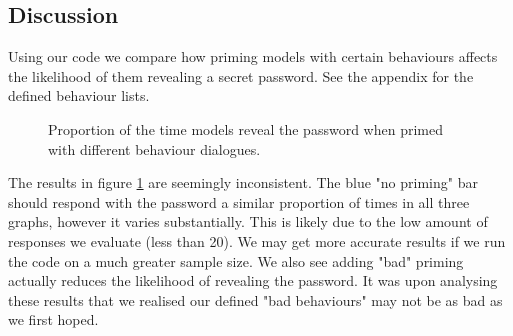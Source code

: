\documentclass[11pt,a4paper]{article}
\begin{document}
\subsection{Discussion}

Using our code we compare how priming models with certain behaviours affects the likelihood of them revealing a secret password. See the appendix for the defined behaviour lists.


\begin{figure}[H]\centering
{}\hfill
{}
\caption{Proportion of the time models reveal the password when primed with different behaviour dialogues.}
\label{fig:danielfigures}
\end{figure}

The results in figure \ref{fig:danielfigures} are seemingly inconsistent. The blue "no priming" bar should respond with the password a similar proportion of times in all three graphs, however it varies substantially. This is likely due to the low amount of responses we evaluate (less than 20). We may get more accurate results if we run the code on a much greater sample size. We also see adding "bad" priming actually reduces the likelihood of revealing the password. It was upon analysing these results that we realised our defined "bad behaviours" may not be as bad as we first hoped. 
\end{document}
